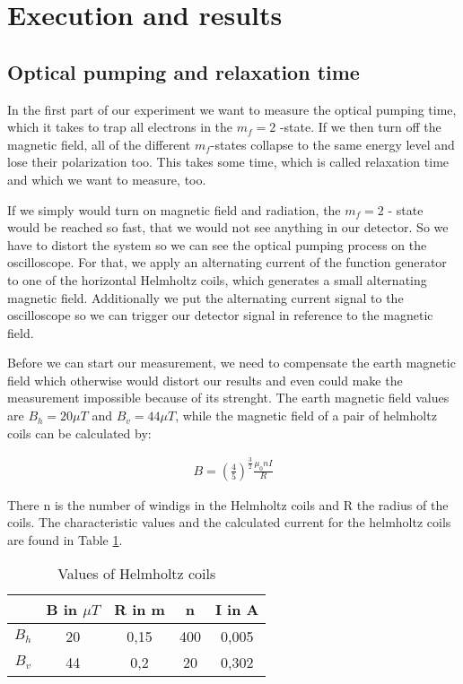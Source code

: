 \section{Execution and results}
\subsection{Optical pumping and relaxation time}
In the first part of our experiment we want to measure the optical pumping time, which it takes to trap all electrons in the $m_f = 2$ -state. If we then turn off the magnetic field, all of the different $m_f$-states collapse to the same energy level and lose their polarization too. This takes some time, which is called relaxation time and which we want to measure, too. 

If we simply would turn on magnetic field and radiation, the $m_f=2$ - state would be reached so fast, that we would not see anything in our detector. So we have to distort the system so we can see the optical pumping process on the oscilloscope. For that, we apply an alternating current of the function generator to one of the horizontal Helmholtz coils, which generates a small alternating magnetic field. Additionally we put the alternating current signal to the oscilloscope so we can trigger our detector signal in reference to the magnetic field. 

Before we can start our measurement, we need to compensate the earth magnetic field which otherwise would distort our results and even could make the measurement impossible because of its strenght. The earth magnetic field values are $B_h= 20 \mu T$ and $B_v = 44 \mu T$, while the magnetic field of a pair of helmholtz coils can be calculated by:

\begin{align}
B= \left(\frac{4}{5}\right)^{\frac{3}{2}}\frac{\mu _0 nI}{R}
\end{align}

There n is the number of windigs in the Helmholtz coils and R the radius of the coils. The characteristic values and the calculated current for the helmholtz coils are found in Table \ref{coils}. 

\begin{table}[h]
	\caption{Values of Helmholtz coils}
	\begin{tabular}{|c|c|c|c|c|}
	\hline
	 & B in $\mu T$ & R in m & n & I in A \\ \hline
	   $B_h$ & 20 & 0,15 & 400 & 0,005\\ \hline
	   $B_v$ & 44 & 0,2 & 20 & 0,302 \\ \hline
	\end{tabular}
\label{coils}
\end{table}

